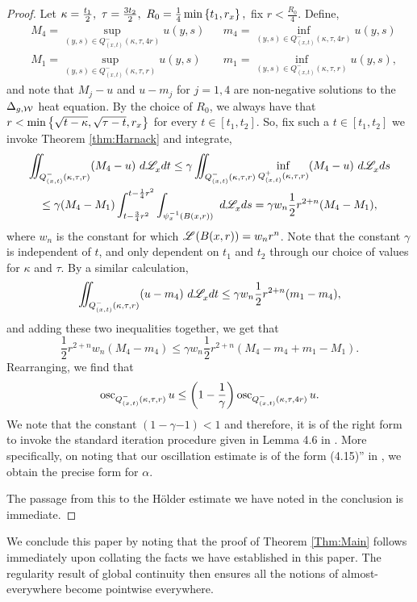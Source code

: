 \documentclass[a4paper, 12pt]{amsart}
\begin{document}
\begin{proof}
Let 
$\kappa = \frac{t_1}{2},\ \tau = \frac{3t_2}{2},\ R_0 = \frac{1}{4} \min\left\{t_1, r_x\right\},$ fix $r < \frac{R_0}{4}$.
Define, 
\begin{align*}
&M_4 = \sup_{(y,s) \in Q^{-}_{(x,t)}(\kappa, \tau, 4r)} u(y,s) &&m_4 = \inf_{(y,s) \in Q^{-}_{(x,t)}(\kappa, \tau, 4r)} u(y,s) \\
&M_1 = \sup_{(y,s) \in Q^{-}_{(x,t)}(\kappa, \tau, r)} u(y,s) &&m_1 = \inf_{(y,s) \in Q^{-}_{(x,t)}(\kappa, \tau, r)} u(y,s), 
\end{align*} 
and note that $M_j - u$ and $u - m_j$ for $j = 1, 4$ are non-negative
solutions to the $\Delta_{g,\mathcal{W}}$ heat equation.
By the choice of $R_0$,
we always have that $r < \min\left\{ \sqrt{t - \kappa}, \sqrt{\tau - t}, r_x\right\}$
for every $t \in [t_1, t_2]$. 
So, fix such a $t \in [t_1, t_2]$ we invoke Theorem \ref{thm:Harnack} and integrate,
\begin{multline*}
\iint_{Q^-_{(x,t)}(\kappa,\tau,r)} (M_4 - u)\ d\Leb_x dt 
	\leq \gamma \iint_{Q^-_{(x,t)}(\kappa,\tau,r)} \inf_{Q^+_{(x,t)}(\kappa, \tau, r)} (M_4 - u)\ d\Leb_x ds \\
	\leq \gamma (M_4 - M_1) \int_{t- \frac{3}{4}r^2}^{t - \frac{1}{4}r^2} \int_{\psi_x^{-1}(B(x,r))}\ d\Leb_x ds
	= \gamma w_n  \frac{1}{2}r^{2+n} (M_4 - M_1),$$
\end{multline*}
where $w_n$ is the constant for which $\mathscr{L}^{{}}(B(x,r)) = w_n r^n$.
Note that the constant $\gamma$ is independent of $t$, and only 
dependent on $t_1$ and $t_2$ through our choice
of values for $\kappa$ and $\tau$. 
By a similar calculation, 
$$
\iint_{Q^-_{(x,t)}(\kappa,\tau,r)} (u - m_4)\ d\Leb_x dt \leq \gamma w_n \frac{1}{2}r^{2+n} (m_1 - m_4),$$
and adding these two inequalities together, 
we get that
$$
\frac{1}{2}r^{2+n} w_n (M_4 - m_4) \leq \gamma w_n \frac{1}{2}r^{2+n} (M_4 - m_4 +m_1 - M_1).$$
Rearranging, we find that 
$$
\operatorname{osc}_{Q^{-}_{(x,t)}(\kappa, \tau, r)} u \leq \left(1 - \frac{1}{\gamma}\right) \operatorname{osc}_{Q^{-}_{(x,t)}(\kappa, \tau, 4r)} u.$$
We note that the constant $(1 - \gamma{-1}) < 1$
and therefore, it is of the right form to invoke the
standard iteration procedure given in Lemma 4.6 in \cite{Lieberman}. 
More specifically, on noting that
our oscillation estimate is of the form (4.15)'' in \cite{Lieberman},
we obtain the precise form for $\alpha$.

The passage from this to the Hölder estimate
we have noted in the conclusion is immediate. 
\end{proof}

We conclude this paper by noting that the proof of Theorem \ref{Thm:Main}
follows immediately upon collating the facts we have established
in this paper. The regularity result of global continuity then ensures all the notions of almost-everywhere become pointwise everywhere.




\setlength{\parskip}{0pt}
\end{document}
